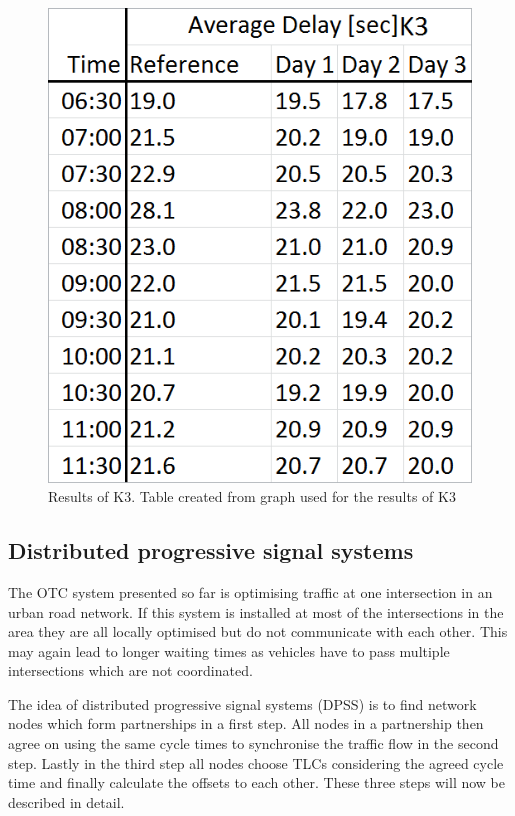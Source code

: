 \begin{figure} [!htb]
	\centering
	\includegraphics[scale=0.60]{pic/K3_ResultTable.png}
	\caption{Results of K3. Table created from graph used for the results of K3 \cite{organic1}}
	\label{fig:K3result}
\end{figure}

\subsection{Distributed progressive signal systems}
The OTC system presented so far is optimising traffic at one intersection in an urban road network. If this system is installed at most of the intersections in the area they are all locally optimised but do not communicate with each other. This may again lead to longer waiting times as vehicles have to pass multiple intersections which are not coordinated.\cite{organic1}\cite{organicRouting}

The idea of distributed progressive signal systems (DPSS) is to find network nodes which form partnerships in a first step.  All nodes in a partnership then agree on using the same cycle times to synchronise the traffic flow in the second step. Lastly in the third step all nodes choose TLCs considering the agreed cycle time and finally calculate the offsets to each other. These three steps will now be described in detail.\ \\

